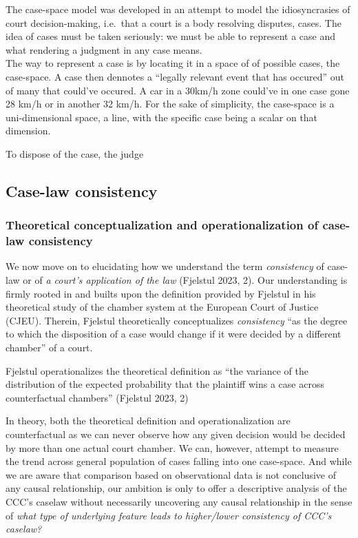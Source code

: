 \documentclass[
  11pt,
]{article}
\begin{document}
The case-space model was developed in an attempt to model the
idiosyncrasies of court decision-making, i.e.~that a court is a body
resolving disputes, cases. The idea of cases must be taken seriously: we
must be able to represent a case and what rendering a judgment in any
case means.\\
The way to represent a case is by locating it in a space of of possible
cases, the case-space. A case then dennotes a ``legally relevant event
that has occured'' out of many that could've occured. A car in a 30km/h
zone could've in one case gone 28 km/h or in another 32 km/h. For the
sake of simplicity, the case-space is a uni-dimensional space, a line,
with the specific case being a scalar on that dimension.

To dispose of the case, the judge

\hypertarget{case-law-consistency}{%
\subsection{Case-law consistency}\label{case-law-consistency}}

\hypertarget{theoretical-conceptualization-and-operationalization-of-case-law-consistency}{%
\subsubsection{Theoretical conceptualization and operationalization of
case-law
consistency}\label{theoretical-conceptualization-and-operationalization-of-case-law-consistency}}

We now move on to elucidating how we understand the term
\emph{consistency} of case-law or of \emph{a court's application of the
law} (Fjelstul 2023, 2). Our understanding is firmly rooted in and
builts upon the definition provided by Fjelstul in his theoretical study
of the chamber system at the European Court of Justice (CJEU). Therein,
Fjelstul theoretically conceptualizes \emph{consistency} ``as the degree
to which the disposition of a case would change if it were decided by a
different chamber'' of a court.

Fjelstul operationalizes the theoretical definition as ``the variance of
the distribution of the expected probability that the plaintiff wins a
case across counterfactual chambers'' (Fjelstul 2023, 2)

In theory, both the theoretical definition and operationalization are
counterfactual as we can never observe how any given decision would be
decided by more than one actual court chamber. We can, however, attempt
to measure the trend across general population of cases falling into one
case-space. And while we are aware that comparison based on
observational data is not conclusive of any causal relationship, our
ambition is only to offer a descriptive analysis of the CCC's caselaw
without necessarily uncovering any causal relationship in the sense of
\emph{what type of underlying feature leads to higher/lower consistency
of CCC's caselaw?}
\end{document}
